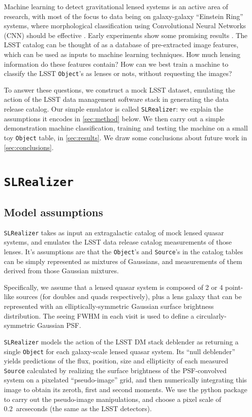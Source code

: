 \documentclass[\docopts]{\docclass}
\def\SLRealizer{\texttt{SLRealizer}\xspace}
\def\Object{\texttt{Object}\xspace}
\def\Source{\texttt{Source}\xspace}
\begin{document}
Machine learning to detect gravitational lensed systems is an active
area of research, with most of the focus to data being on galaxy-galaxy
``Einstein Ring'' systems, where  morphological classification using
Convolutional Neural Networks (CNN) should be effective
\citep{convolution_neural_network}. Early experiments show some
promising results \citep{LensExtractor,CMUDeepLens,Jacobs2017}. The LSST
catalog can be thought of as a database of pre-extracted image features,
which can be used as inputs to machine learning techniques. How much
lensing information do these features contain? How can we best train a
machine to classify the LSST \Object's as lenses or nots, without
requesting the images?

To answer these questions, we construct a mock LSST dataset, emulating
the action of the LSST data management software stack in generating the
data release catalog. Our simple emulator is called \SLRealizer: we
explain the assumptions it encodes in \autoref{sec:method} below. We
then carry out a simple demonstration machine classification, training
and testing the machine on a small toy \Object table, in
\autoref{sec:results}. We draw some conclusions about future work in
\autoref{sec:conclusions}.


\section{\SLRealizer}
\label{sec:method}

\subsection{Model assumptions}
\label{subsec:model}

\SLRealizer takes as input an extragalactic catalog of mock lensed
quasar systems, and emulates the LSST data release catalog measurements
of those lenses. It's assumptions are that the \Object's and \Source's
in the catalog tables can be simply represented as mixtures of
Gaussians, and measurements of them derived from those Gaussian
mixtures.

Specifically, we assume that a lensed quasar system is composed of 2 or
4 point-like sources (for doubles and quads respectively), plus a lens
galaxy that can be represented with an elliptically-symmetric Gaussian
surface brightness distribution. The seeing FWHM in each visit is used
to define a circularly-symmetric Gaussian PSF.

\SLRealizer models the action of the LSST DM stack deblender as
returning a single \Object for each galaxy-scale lensed quasar system.
Its ``null deblender'' yields predictions of the flux, position, size
and ellipticity of each measured \Source calculated by realizing the
surface brightness of the PSF-convolved system on a pixelated
``pseudo-image'' grid, and then numerically integrating this image to
obtain its zeroth, first and second moments. We use the python \GalSim
package to carry out the pseudo-image manipulations, and choose a pixel
scale of 0.2~arcseconds (the same as the LSST detectors).
\end{document}
